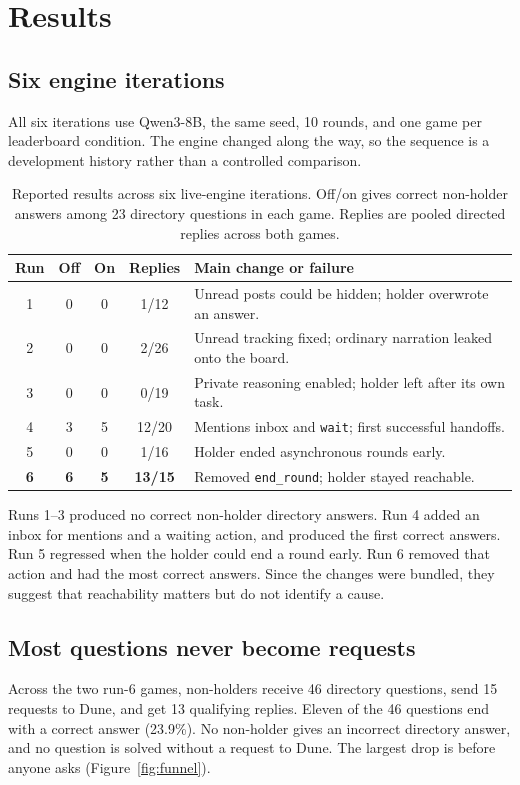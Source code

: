 \documentclass{article}
\newcommand{\tool}[1]{\texttt{#1}}
\begin{document}
\section{Results}
\subsection{Six engine iterations}
All six iterations use Qwen3-8B, the same seed, 10 rounds, and one game per leaderboard condition. The engine changed along the way, so the sequence is a development history rather than a controlled comparison.

\begin{table}[t]
\caption{Reported results across six live-engine iterations. Off/on gives correct non-holder answers among 23 directory questions in each game. Replies are pooled directed replies across both games.}
\label{tab:iterations}
\centering\footnotesize
\begin{tabular}{@{}c c c c p{2.67in}@{}}
\toprule
Run & Off & On & Replies & Main change or failure \\
\midrule
1 & 0 & 0 & 1/12 & Unread posts could be hidden; holder overwrote an answer. \\
2 & 0 & 0 & 2/26 & Unread tracking fixed; ordinary narration leaked onto the board. \\
3 & 0 & 0 & 0/19 & Private reasoning enabled; holder left after its own task. \\
4 & 3 & 5 & 12/20 & Mentions inbox and \tool{wait}; first successful handoffs. \\
5 & 0 & 0 & 1/16 & Holder ended asynchronous rounds early. \\
\textbf{6} & \textbf{6} & \textbf{5} & \textbf{13/15} & Removed \tool{end\_round}; holder stayed reachable. \\
\bottomrule
\end{tabular}
\end{table}

Runs 1--3 produced no correct non-holder directory answers. Run 4 added an inbox for mentions and a waiting action, and produced the first correct answers. Run 5 regressed when the holder could end a round early. Run 6 removed that action and had the most correct answers. Since the changes were bundled, they suggest that reachability matters but do not identify a cause.

\subsection{Most questions never become requests}
Across the two run-6 games, non-holders receive 46 directory questions, send 15 requests to Dune, and get 13 qualifying replies. Eleven of the 46 questions end with a correct answer (23.9\%). No non-holder gives an incorrect directory answer, and no question is solved without a request to Dune. The largest drop is before anyone asks (Figure~\ref{fig:funnel}).
\end{document}
